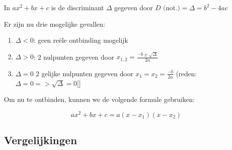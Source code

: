 In \(a x^2 + bx + c \) is de discriminant \( \Delta \) gegeven door \(D \textrm{ (not.)}= \Delta = b^2 - 4ac \)

Er zijn nu drie mogelijke gevallen:

\begin{enumerate}
	\item \(\Delta < 0 \): geen reële ontbinding mogelijk
	\item \(\Delta > 0 \): 2 nulpunten gegeven door \( x_{1,2} = \frac{-b \pm \sqrt{\Delta}}{2a} \)
	\item \(\Delta = 0\) 2 gelijke nulpunten gegeven door \( x_1 = x_2 = \frac{-b}{2a} \) (reden: \(\Delta = 0 => \sqrt{\Delta} = 0 \)[]
\end{enumerate}

Om nu te ontbinden, kunnen we de volgende formule gebruiken:

\[ ax^2 + bx + c = a(x - x_1)(x - x_2) \]


\subsection{Vergelijkingen}

